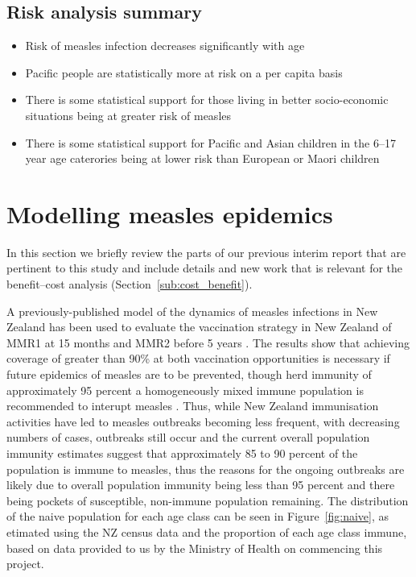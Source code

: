 \documentclass{article}
\begin{document}
\subsection{Risk analysis summary}
\begin{itemize}
\item Risk of measles infection decreases significantly with age
\item Pacific people are statistically more at risk on a per capita basis
\item There is some statistical support for those living in better socio-economic situations being at greater risk of measles
\item There is some statistical support for Pacific and Asian children in the 6--17 year age caterories being at lower risk than European or Maori children
\end{itemize}

\section{Modelling measles epidemics}
\label{sec:epidemic_modelling}

In this section we briefly review the parts of our previous interim report that are pertinent to this study and include details and new work that is relevant for the benefit--cost analysis (Section~\ref{sub:cost_benefit}). 

A previously-published model of the dynamics of measles infections in New Zealand has been used to evaluate the vaccination strategy in New Zealand of MMR1 at 15 months and MMR2 before 5 years \citep{roberts0,roberts4,tobias98}. The results show that achieving coverage of greater than 90\% at both vaccination opportunities is necessary if future epidemics of measles are to be prevented, though herd immunity of approximately 95 percent a homogeneously mixed immune population is recommended to interupt measles \citep{roberts0,roberts4}. Thus, while New Zealand immunisation activities have led to measles outbreaks becoming less frequent, with decreasing numbers of cases, outbreaks still occur and the current overall population immunity estimates suggest that approximately 85 to 90 percent of the population is immune to measles, thus the reasons for the ongoing outbreaks are likely due to overall population immunity being less than 95 percent and there being pockets of susceptible, non-immune population remaining. The distribution of the naive population for each age class can be seen in Figure~\ref{fig:naive}, as etimated using the NZ census data \citep{stats14} and the proportion of each age class immune, based on data provided to us by the Ministry of Health on commencing this project.
\end{document}
